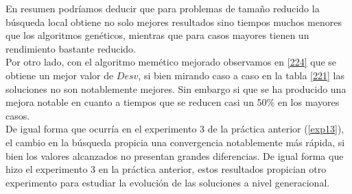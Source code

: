 \documentclass[11pt,a4paper]{article}
\begin{document}
	En resumen podríamos deducir que para problemas de tamaño reducido la búsqueda local obtiene no solo mejores resultados sino tiempos muchos menores que los algoritmos genéticos, mientras que para casos mayores tienen un rendimiento bastante reducido. \\
	
	Por otro lado, con el algoritmo memético mejorado observamos en \ref{224} que se obtiene un mejor valor de $Desv$, si bien mirando caso a caso en la tabla \ref{221} las soluciones no son notablemente mejores. Sin embargo si que se ha producido una mejora notable en cuanto a tiempos que se reducen casi un 50\% en los mayores casos. \\
	
	De igual forma que ocurría en el experimento 3 de la práctica anterior (\ref{exp13}), el cambio en la búsqueda propicia una convergencia notablemente más rápida, si bien los valores alcanzados no presentan grandes diferencias. De igual forma que hizo el experimento 3 en la práctica anterior, estos resultados propician otro experimento para estudiar la evolución de las soluciones a nivel generacional.
\end{document}
